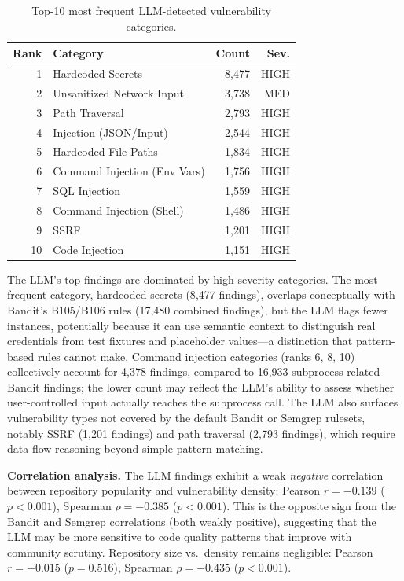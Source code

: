 \documentclass[sigconf,authordraft]{acmart}
\begin{document}
\begin{table}[h]
  \caption{Top-10 most frequent LLM-detected vulnerability categories.}
  \label{tab:top-rules-llm}
  \begin{tabular}{rlrr}
    \toprule
    Rank & Category & Count & Sev. \\
    \midrule
    1  & Hardcoded Secrets            & 8{,}477 & HIGH \\
    2  & Unsanitized Network Input    & 3{,}738 & MED  \\
    3  & Path Traversal               & 2{,}793 & HIGH \\
    4  & Injection (JSON/Input)       & 2{,}544 & HIGH \\
    5  & Hardcoded File Paths         & 1{,}834 & HIGH \\
    6  & Command Injection (Env Vars) & 1{,}756 & HIGH \\
    7  & SQL Injection                & 1{,}559 & HIGH \\
    8  & Command Injection (Shell)    & 1{,}486 & HIGH \\
    9  & SSRF                         & 1{,}201 & HIGH \\
    10 & Code Injection               & 1{,}151 & HIGH \\
    \bottomrule
  \end{tabular}
\end{table}

The LLM's top findings are dominated by high-severity categories. The
most frequent category, hardcoded secrets (8{,}477 findings), overlaps
conceptually with Bandit's B105/B106 rules (17{,}480 combined findings),
but the LLM flags fewer instances, potentially because it can use
semantic context to distinguish real credentials from test fixtures and
placeholder values---a distinction that pattern-based rules cannot make.
Command injection categories (ranks 6, 8, 10) collectively account for
4{,}378 findings, compared to 16{,}933 subprocess-related Bandit
findings; the lower count may reflect the LLM's ability to assess
whether user-controlled input actually reaches the subprocess call. The
LLM also surfaces vulnerability types not covered by the default Bandit
or Semgrep rulesets, notably SSRF (1{,}201 findings) and path traversal
(2{,}793 findings), which require data-flow reasoning beyond simple
pattern matching.

\textbf{Correlation analysis.}
The LLM findings exhibit a weak \emph{negative} correlation between
repository popularity and vulnerability density: Pearson $r = -0.139$
($p < 0.001$), Spearman $\rho = -0.385$ ($p < 0.001$). This is the
opposite sign from the Bandit and Semgrep correlations (both weakly
positive), suggesting that the LLM may be more sensitive to code quality
patterns that improve with community scrutiny. Repository size vs.\
density remains negligible: Pearson $r = -0.015$ ($p = 0.516$), Spearman
$\rho = -0.435$ ($p < 0.001$).
\end{document}
